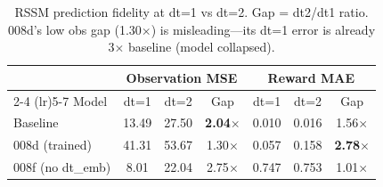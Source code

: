 \begin{table}[t]
\centering
\caption{RSSM prediction fidelity at dt=1 vs dt=2. Gap = dt2/dt1 ratio.
008d's low obs gap (1.30$\times$) is misleading---its dt=1 error is already 3$\times$ baseline (model collapsed).}
\label{tab:rssm_fidelity}
\small
\begin{tabular}{lcccccc}
\toprule
& \multicolumn{3}{c}{Observation MSE} & \multicolumn{3}{c}{Reward MAE} \\
\cmidrule(lr){2-4} \cmidrule(lr){5-7}
Model & dt=1 & dt=2 & Gap & dt=1 & dt=2 & Gap \\
\midrule
Baseline          & 13.49 & 27.50 & \textbf{2.04$\times$} & 0.010 & 0.016 & 1.56$\times$ \\
008d (trained)    & 41.31 & 53.67 & 1.30$\times$          & 0.057 & 0.158 & \textbf{2.78$\times$} \\
008f (no dt\_emb) & 8.01  & 22.04 & 2.75$\times$          & 0.747 & 0.753 & 1.01$\times$ \\
\bottomrule
\end{tabular}
\end{table}